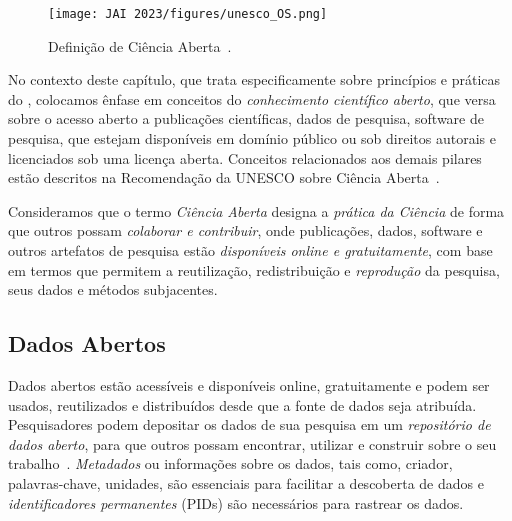 \begin{figure}[htbp]
    \centering
    \texttt{[image: JAI 2023/figures/unesco\_OS.png]}
    \caption{Definição de Ciência Aberta~\cite{unesco:2021}.}
    \label{fig:unesco}
\end{figure}

No contexto deste capítulo, que trata especificamente sobre princípios e práticas do \RS, colocamos ênfase em conceitos do \textit{conhecimento científico aberto}, que versa sobre o 
acesso aberto a publicações científicas, dados de pesquisa, software de pesquisa, que estejam disponíveis em domínio público ou sob direitos autorais e licenciados sob uma licença aberta. Conceitos relacionados aos demais pilares estão descritos na Recomendação da UNESCO sobre Ciência Aberta~\cite{unesco:2021}.

Consideramos que o termo \textit{Ciência Aberta} designa a \textit{prática da Ciência} de forma que outros possam \textit{colaborar e contribuir}, onde publicações, dados, software e outros artefatos de pesquisa estão \textit{disponíveis online e gratuitamente}, com base em termos que permitem a reutilização, redistribuição e \textit{reprodução} da pesquisa, seus dados e métodos subjacentes.
%




\subsection{Dados Abertos}

Dados abertos estão acessíveis e disponíveis online, gratuitamente e podem ser usados, reutilizados e distribuídos desde que a fonte de dados seja atribuída.
%
Pesquisadores podem depositar os dados de sua pesquisa em um \textit{repositório de dados aberto}, para que outros possam encontrar, utilizar e construir sobre o seu trabalho~\cite{training:handbook}.
%
\textit{Metadados} ou informações sobre os dados, tais como, criador, palavras-chave, unidades, são essenciais para facilitar a descoberta de dados e 
\textit{identificadores permanentes} (PIDs) são necessários para rastrear os dados.


